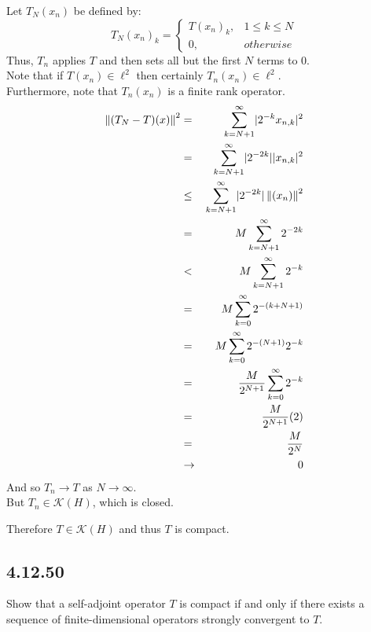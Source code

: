 \documentclass[letterpaper,12pt,fleqn]{article}
\newcommand{\norm}[1]{\left\|#1\right\|}
\newcommand{\mk}{\mathcal{K}}
\begin{document}
Let $T_N(x_n)$ be defined by:
\[T_N(x_n)_k=\begin{cases}
T(x_n)_k, & 1\le k\le N \\
0, & otherwise
\end{cases}\]
Thus, $T_n$ applies $T$ and then sets all but the first $N$ terms to $0$. \\
Note that if $T(x_n)\in\ell^2$ then certainly $T_n(x_n)\in\ell^2$. \\
Furthermore, note that $T_n(x_n)$ is a finite rank operator.
\begin{eqnarray*}
  \norm{(T_N-T)(x)}^2 &=& \sum_{k=N+1}^{\infty}\abs{2^{-k}x_{n,k}}^2 \\
  &=& \sum_{k=N+1}^{\infty}\abs{2^{-2k}}\abs{x_{n,k}}^2 \\
  &\le& \sum_{k=N+1}^{\infty}\abs{2^{-2k}}\norm{(x_n)}^2 \\
  &=& M\sum_{k=N+1}^{\infty}2^{-2k} \\
  &<& M\sum_{k=N+1}^{\infty}2^{-k} \\
  &=& M\sum_{k=0}^{\infty}2^{-(k+N+1)} \\
  &=& M\sum_{k=0}^{\infty}2^{-(N+1)}2^{-k} \\
  &=& \frac{M}{2^{N+1}}\sum_{k=0}^{\infty}2^{-k} \\
  &=& \frac{M}{2^{N+1}}(2) \\
  &=& \frac{M}{2^N} \\
  &\to& 0
\end{eqnarray*}
And so $T_n\to T$ as $N\to\infty$. \\
But $T_n\in\mk(H)$, which is closed.

Therefore $T\in\mk(H)$ and thus $T$ is compact.

\subsection*{4.12.50}

Show that a self-adjoint operator $T$ is compact if and only if there exists a
sequence of finite-dimensional operators strongly convergent to $T$.
\end{document}
